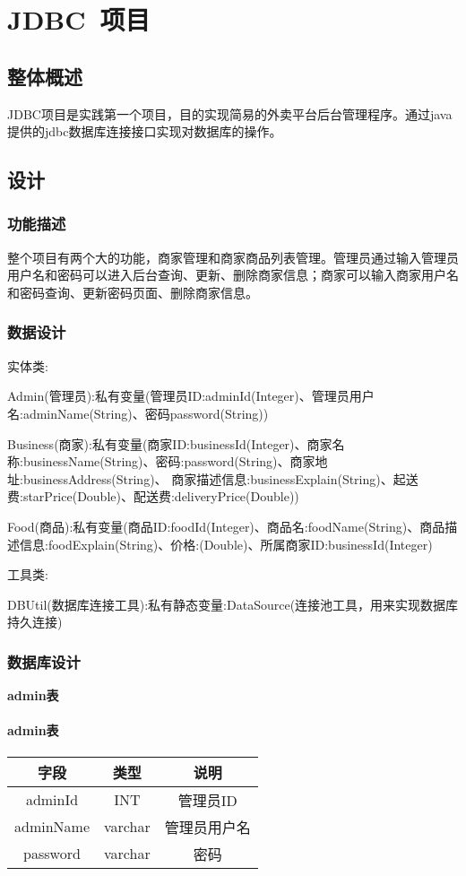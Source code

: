 \chapter{JDBC~项目}

\section{整体概述}
JDBC项目是实践第一个项目，目的实现简易的外卖平台后台管理程序。通过java提供的jdbc数据库连接接口实现对数据库的操作。

\section{设计}
\subsection{功能描述}
整个项目有两个大的功能，商家管理和商家商品列表管理。管理员通过输入管理员用户名和密码可以进入后台查询、更新、删除商家信息；商家可以输入商家用户名和密码查询、更新密码页面、删除商家信息。

\subsection{数据设计}
实体类:

Admin(管理员):私有变量(管理员ID:adminId(Integer)、管理员用户名:adminName(String)、密码password(String))

Business(商家):私有变量(商家ID:businessId(Integer)、商家名称:businessName(String)、密码:password(String)、商家地址:businessAddress(String)、
商家描述信息:businessExplain(String)、起送费:starPrice(Double)、配送费:deliveryPrice(Double))

Food(商品):私有变量(商品ID:foodId(Integer)、商品名:foodName(String)、商品描述信息:foodExplain(String)、价格:(Double)、所属商家ID:businessId(Integer)

工具类:

DBUtil(数据库连接工具):私有静态变量:DataSource(连接池工具，用来实现数据库持久连接)

\subsection{数据库设计}
\textbf{admin表}
    \subsubsection{admin表}
    \begin{tabular}{c|c|c}
    	\hline
    	字段 & 类型 & 说明 \\
    	\hline
    	adminId & INT & 管理员ID \\
    	\hline
    	adminName & varchar & 管理员用户名 \\
    	\hline
    	password & varchar & 密码 \\
    \end{tabular}
    
